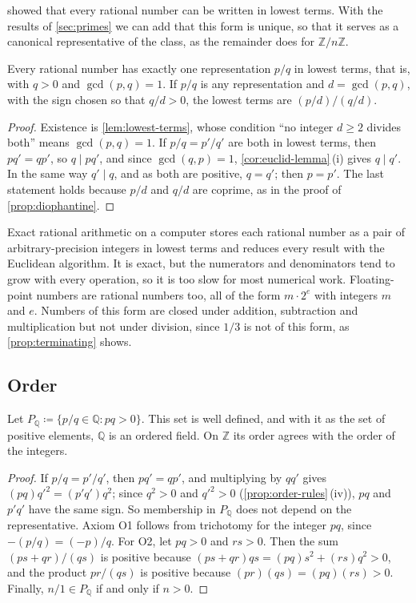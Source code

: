  showed that every rational number can be written in lowest terms. With the results of \cref{sec:primes} we can add that this form is unique, so that it serves as a canonical representative of the class, as the remainder does for $\mathbb Z/n\mathbb Z$.

\begin{proposition}
\label{prop:lowest-unique}
Every rational number has exactly one representation $p/q$ in lowest terms, that is, with $q>0$ and $\gcd(p,q)=1$. If $p/q$ is any representation and $d=\gcd(p,q)$, with the sign chosen so that $q/d>0$, the lowest terms are $(p/d)/(q/d)$.
\end{proposition}

\begin{proof}
Existence is \cref{lem:lowest-terms}, whose condition ``no integer $d\ge2$ divides both'' means $\gcd(p,q)=1$. If $p/q=p'/q'$ are both in lowest terms, then $pq'=qp'$, so $q\mid pq'$, and since $\gcd(q,p)=1$, \cref{cor:euclid-lemma}\,(i) gives $q\mid q'$. In the same way $q'\mid q$, and as both are positive, $q=q'$; then $p=p'$. The last statement holds because $p/d$ and $q/d$ are coprime, as in the proof of \cref{prop:diophantine}.
\end{proof}

Exact rational arithmetic on a computer stores each rational number as a pair of arbitrary-precision integers in lowest terms and reduces every result with the Euclidean algorithm. It is exact, but the numerators and denominators tend to grow with every operation, so it is too slow for most numerical work. Floating-point numbers are rational numbers too, all of the form $m\cdot2^e$ with integers $m$ and $e$. Numbers of this form are closed under addition, subtraction and multiplication but not under division, since $1/3$ is not of this form, as \cref{prop:terminating} shows.

\subsection{Order}

\begin{theorem}
\label{thm:q-ordered}
Let $P_{\mathbb Q}\coloneqq\{p/q\in\mathbb Q: pq>0\}$. This set is well defined, and with it as the set of positive elements, $\mathbb Q$ is an ordered field. On $\mathbb Z$ its order agrees with the order of the integers.
\end{theorem}

\begin{proof}
If $p/q=p'/q'$, then $pq'=qp'$, and multiplying by $qq'$ gives $(pq)q'^2=(p'q')q^2$; since $q^2>0$ and $q'^2>0$ (\cref{prop:order-rules}\,(iv)), $pq$ and $p'q'$ have the same sign. So membership in $P_{\mathbb Q}$ does not depend on the representative. Axiom O1 follows from trichotomy for the integer $pq$, since $-(p/q)=(-p)/q$. For O2, let $pq>0$ and $rs>0$. Then the sum $(ps+qr)/(qs)$ is positive because $(ps+qr)qs=(pq)s^2+(rs)q^2>0$, and the product $pr/(qs)$ is positive because $(pr)(qs)=(pq)(rs)>0$. Finally, $n/1\in P_{\mathbb Q}$ if and only if $n>0$.
\end{proof}

